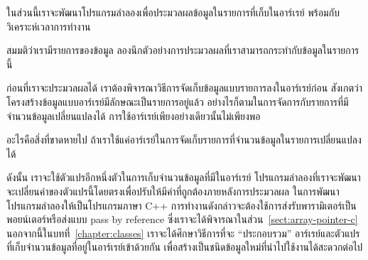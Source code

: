 ใน{\wbr}ส่วน{\wbr}นี้{\wbr}เรา{\wbr}จะ{\wbr}พัฒนา{\wbr}โปรแกรม{\wbr}ลำลอง{\wbr}เพื่อ{\wbr}ประมวล{\wbr}ผล{\wbr}ข้อมูล{\wbr}ใน{\wbr}รายการ{\wbr}ที่{\wbr}เก็บ{\wbr}ใน{\wbr}อาร์{\wbr}เรย์
พร้อม{\wbr}กับ{\wbr}วิเคราะห์{\wbr}เวลา{\wbr}การ{\wbr}ทำงาน{\wbr}

\begin{quiz}{}
สมมติ{\wbr}ว่า{\wbr}เรา{\wbr}มี{\wbr}รายการ{\wbr}ของ{\wbr}ข้อมูล ลอง{\wbr}นึก{\wbr}ตัวอย่าง{\wbr}การ{\wbr}ประมวล{\wbr}ผล{\wbr}ที่{\wbr}เรา{\wbr}สามารถ{\wbr}กระทำ{\wbr}กับ{\wbr}ข้อมูล{\wbr}ใน{\wbr}รายการ{\wbr}นี้{\wbr}
\end{quiz}

ก่อน{\wbr}ที่{\wbr}เรา{\wbr}จะ{\wbr}ประมวล{\wbr}ผล{\wbr}ได้ เรา{\wbr}ต้อง{\wbr}พิจารณา{\wbr}วิธีการ{\wbr}จัด{\wbr}เก็บ{\wbr}ข้อมูล{\wbr}แบบ{\wbr}รายการ{\wbr}ลง{\wbr}ใน{\wbr}อาร์{\wbr}เรย์{\wbr}ก่อน{\wbr}
สังเกต{\wbr}ว่า{\wbr}โครงสร้าง{\wbr}ข้อมูล{\wbr}แบบ{\wbr}อาร์{\wbr}เรย์{\wbr}มี{\wbr}ลักษณะ{\wbr}เป็น{\wbr}รายการ{\wbr}อยู่{\wbr}แล้ว{\wbr}
อย่างไร{\wbr}ก็{\wbr}ตาม{\wbr}ใน{\wbr}การ{\wbr}จัดการ{\wbr}กับ{\wbr}รายการ{\wbr}ที่{\wbr}มี{\wbr}จำนวน{\wbr}ข้อมูล{\wbr}เปลี่ยนแปลง{\wbr}ได้{\wbr}
การ{\wbr}ใช้{\wbr}อาร์{\wbr}เรย์{\wbr}เพียง{\wbr}อย่าง{\wbr}เดียว{\wbr}นั้น{\wbr}ไม่{\wbr}เพียงพอ{\wbr}

\begin{quiz}{}
อะไร{\wbr}คือ{\wbr}สิ่ง{\wbr}ที่{\wbr}ขาด{\wbr}หาย{\wbr}ไป ถ้า{\wbr}เรา{\wbr}ใช้{\wbr}แค่{\wbr}อาร์{\wbr}เรย์{\wbr}ใน{\wbr}การ{\wbr}จัด{\wbr}เก็บ{\wbr}รายการ{\wbr}ที่{\wbr}จำนวน{\wbr}ข้อมูล{\wbr}ใน{\wbr}รายการ{\wbr}เปลี่ยนแปลง{\wbr}ได้{\wbr}
\end{quiz}

ดังนั้น เรา{\wbr}จะ{\wbr}ใช้{\wbr}ตัวแปร{\wbr}อีก{\wbr}หนึ่ง{\wbr}ตัว{\wbr}ใน{\wbr}การ{\wbr}เก็บ{\wbr}จำนวน{\wbr}ข้อมูล{\wbr}ที่{\wbr}มี{\wbr}ใน{\wbr}อาร์{\wbr}เรย์
โปรแกรม{\wbr}ลำลอง{\wbr}ที่{\wbr}เรา{\wbr}จะ{\wbr}พัฒนา{\wbr}จะ{\wbr}เปลี่ยน{\wbr}ค่า{\wbr}ของ{\wbr}ตัวแปร{\wbr}นี้{\wbr}โดย{\wbr}ตรง{\wbr}เพื่อ{\wbr}ปรับ{\wbr}ให้{\wbr}มี{\wbr}ค่า{\wbr}ที่{\wbr}ถูกต้อง{\wbr}ภายหลัง{\wbr}การ{\wbr}ประมวล{\wbr}ผล{\wbr}
ใน{\wbr}การ{\wbr}พัฒนา{\wbr}โปรแกรม{\wbr}ลำลอง{\wbr}ให้{\wbr}เป็น{\wbr}โปรแกรม{\wbr}ภาษา C++
การ{\wbr}ทำงาน{\wbr}ดัง{\wbr}กล่าว{\wbr}จะ{\wbr}ต้อง{\wbr}ใช้{\wbr}การ{\wbr}ส่ง{\wbr}รับ{\wbr}พารามิเตอร์{\wbr}เป็น{\wbr}พอยน์เตอร์{\wbr}หรือ{\wbr}ส่ง{\wbr}แบบ pass by
reference ซึ่ง{\wbr}เรา{\wbr}จะ{\wbr}ได้{\wbr}พิจารณา{\wbr}ใน{\wbr}ส่วน~\ref{sect:array-pointer-c}
นอกจาก{\wbr}นี้{\wbr}ใน{\wbr}บท{\wbr}ที่~\ref{chapter:classes} เรา{\wbr}จะ{\wbr}ได้{\wbr}ศึกษา{\wbr}วิธีการ{\wbr}ที่{\wbr}จะ ``ประกอบ{\wbr}รวม''
อาร์{\wbr}เรย์{\wbr}และ{\wbr}ตัวแปร{\wbr}ที่{\wbr}เก็บ{\wbr}จำนวน{\wbr}ข้อมูล{\wbr}ที่{\wbr}อยู่{\wbr}ใน{\wbr}อาร์{\wbr}เรย์{\wbr}เข้า{\wbr}ด้วย{\wbr}กัน{\wbr}
เพื่อ{\wbr}สร้าง{\wbr}เป็น{\wbr}ชนิด{\wbr}ข้อมูล{\wbr}ใหม่{\wbr}ที่{\wbr}นำ{\wbr}ไป{\wbr}ใช้งาน{\wbr}ได้{\wbr}สะดวก{\wbr}ต่อ{\wbr}ไป{\wbr}

